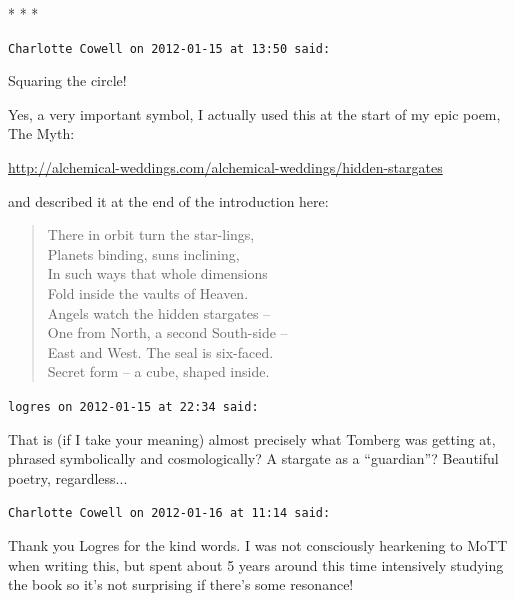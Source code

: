 
\begin{center}* * *\end{center}

\begin{footnotesize}
\begin{sffamily}
\texttt{Charlotte Cowell on 2012-01-15 at 13:50 said:}

Squaring the circle!

Yes, a very important symbol, I actually used this at the start of my epic poem, The Myth:

\url{http://alchemical-weddings.com/alchemical-weddings/hidden-stargates}


and described it at the end of the introduction here:
\begin{verse}
There in orbit turn the star-lings,\\
Planets binding, suns inclining,\\
In such ways that whole dimensions\\
Fold inside the vaults of Heaven.\\
Angels watch the hidden stargates --\\
One from North, a second South-side --\\
East and West. The seal is six-faced.\\
Secret form -- a cube, shaped inside.
\end{verse}

\hfill

\texttt{logres on 2012-01-15 at 22:34 said:}

That is (if I take your meaning) almost precisely what Tomberg was getting at, phrased symbolically and cosmologically? A stargate as a ``guardian''? Beautiful poetry, regardless... 

\hfill

\texttt{Charlotte Cowell on 2012-01-16 at 11:14 said:}

Thank you Logres for the kind words. I was not consciously hearkening to MoTT when writing this, but spent about 5 years around this time intensively studying the book so it's not surprising if there's some resonance!


\hfill

\end{sffamily}
\end{footnotesize}

